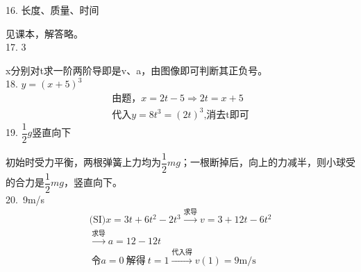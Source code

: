 \documentclass[b5paper,opensource]{./template/qyxf-book}
\begin{document}
16. 长度、质量、时间\par
见课本，解答略。\\
17. 3\par
x分别对t求一阶两阶导即是v、a，由图像即可判断其正负号。\\
18. $y={(x+5)}^3$
\vspace{-1em}
\begin{gather*}\text{由题，}x=2t-5\Rightarrow 2t=x+5\\
\text{代入}y=8t^3={(2t)}^3\text{,消去t即可}
\end{gather*}	
19. $\dfrac{1}{2}g$\qquad 竖直向下\par
初始时受力平衡，两根弹簧上力均为$\dfrac{1}{2}mg$；一根断掉后，向上的力减半，则小球受的合力是$\dfrac{1}{2}mg$，竖直向下。\\
20.\ 9m/s 
\vspace{-1em}
\begin{gather*}\text{(SI)} x=3t+6t^2-2t^3\xrightarrow{\text{求导}}v=3+12t-6t^2\\
\xrightarrow{\text{求导}}a=12-12t\\\
令a=0\ \text{解得}\ t=1\xrightarrow{\text{代入得}} v(1)=9\mathrm{m/s}
\end{gather*}
\end{document}
